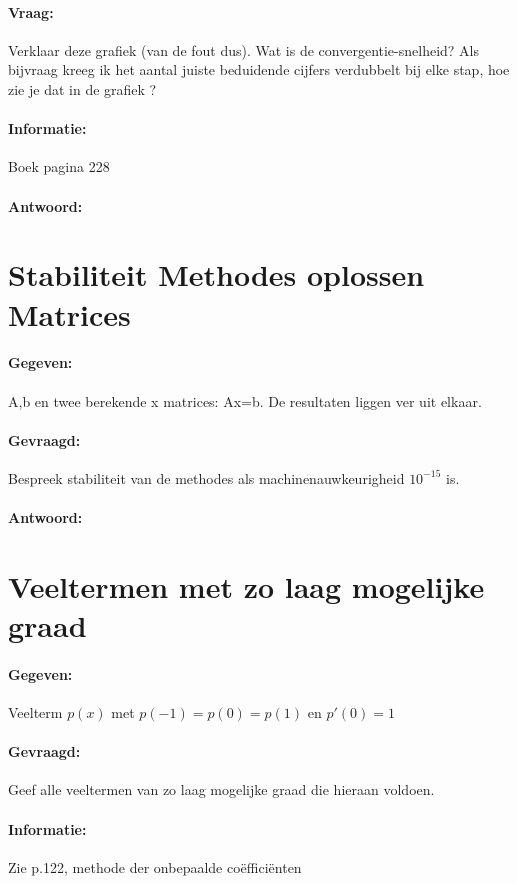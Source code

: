 \documentclass[12pt]{article}
\begin{document}
\paragraph{Vraag:}  Verklaar deze grafiek (van de fout dus). Wat is de convergentie-snelheid? Als bijvraag kreeg ik het aantal juiste beduidende cijfers verdubbelt bij elke stap, hoe zie je dat in de grafiek ?

\paragraph{Informatie:} Boek pagina 228
\paragraph{Antwoord:}

\newpage

\section{Stabiliteit Methodes oplossen Matrices}
\paragraph{Gegeven:} A,b en twee berekende x matrices: Ax=b. De resultaten liggen ver uit elkaar.
\paragraph{Gevraagd:} Bespreek stabiliteit van de methodes als machinenauwkeurigheid $10^{-15}$ is.
\paragraph{Antwoord:}

\newpage

\section{Veeltermen met zo laag mogelijke graad}
\paragraph{Gegeven:} Veelterm $p(x)$ met $p( − 1) = p(0) = p(1)$ en $p'(0) = 1$
\paragraph{Gevraagd:} Geef alle veeltermen van zo laag mogelijke graad die hieraan voldoen.
\paragraph{Informatie:} Zie p.122, methode der onbepaalde coëfficiënten
\end{document}
